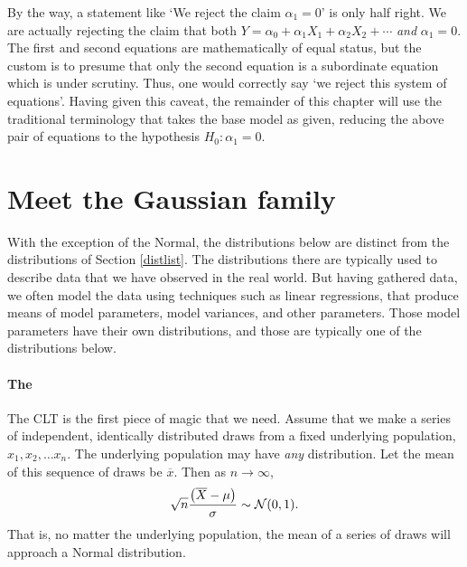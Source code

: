 By the way, a statement like `We reject
the claim $\alpha_1=0$' is only half right. We are actually rejecting
the claim that both
$Y = \alpha_0 + \alpha_1 X_1 + \alpha_2 X_2 + \cdots$ {\em and}
$\alpha_1=0$. 
The first and second equations are mathematically of equal
status, but the custom is to presume that only the second equation is a
subordinate equation which is under scrutiny. Thus, one would correctly
say `we reject this system of equations'. Having given this caveat, the
remainder of this chapter will use the traditional terminology that
takes the base model as given, reducing
the above pair of equations to the hypothesis $H_0: \alpha_1=0$.



\section{Meet the Gaussian family} \label{dist2}
With the exception of the Normal, the distributions below are distinct
from the distributions of Section \ref{distlist}. The distributions
there
are typically used to describe data that we have observed in the real
world. But having gathered data, we often model the data using techniques
such as linear regressions, that produce means of model parameters,
model variances, and other parameters. Those model parameters have their
own distributions, and those are typically one of the distributions below.

\paragraph{The } The CLT is the first piece of magic
that we need.  Assume that we make a series of independent, identically
distributed draws from a fixed underlying population, $x_1, x_2, \dots
x_n$. The underlying population may have {\em any} distribution. Let the
mean of this sequence of draws be $\overline x$. Then as $n\to\infty$,
$$\sqrt{n} \frac{\left(\overline X - \mu\right)}{\sigma} \sim {\cal N}(0,1).$$ 
That is, no matter the underlying population, the mean of a series of
draws will approach a Normal distribution.


